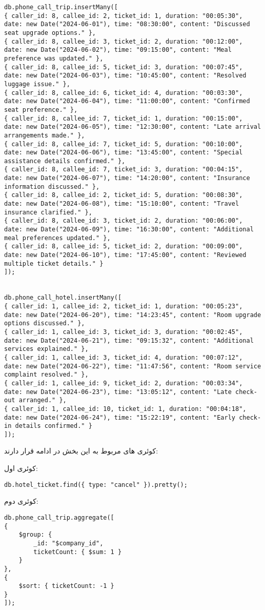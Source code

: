 \begin{lstlisting}
db.phone_call_trip.insertMany([
{ caller_id: 8, callee_id: 2, ticket_id: 1, duration: "00:05:30", date: new Date("2024-06-01"), time: "08:30:00", content: "Discussed seat upgrade options." },
{ caller_id: 8, callee_id: 3, ticket_id: 2, duration: "00:12:00", date: new Date("2024-06-02"), time: "09:15:00", content: "Meal preference was updated." },
{ caller_id: 8, callee_id: 5, ticket_id: 3, duration: "00:07:45", date: new Date("2024-06-03"), time: "10:45:00", content: "Resolved luggage issue." },
{ caller_id: 8, callee_id: 6, ticket_id: 4, duration: "00:03:30", date: new Date("2024-06-04"), time: "11:00:00", content: "Confirmed seat preference." },
{ caller_id: 8, callee_id: 7, ticket_id: 1, duration: "00:15:00", date: new Date("2024-06-05"), time: "12:30:00", content: "Late arrival arrangements made." },
{ caller_id: 8, callee_id: 7, ticket_id: 5, duration: "00:10:00", date: new Date("2024-06-06"), time: "13:45:00", content: "Special assistance details confirmed." },
{ caller_id: 8, callee_id: 7, ticket_id: 3, duration: "00:04:15", date: new Date("2024-06-07"), time: "14:20:00", content: "Insurance information discussed." },
{ caller_id: 8, callee_id: 2, ticket_id: 5, duration: "00:08:30", date: new Date("2024-06-08"), time: "15:10:00", content: "Travel insurance clarified." },
{ caller_id: 8, callee_id: 3, ticket_id: 2, duration: "00:06:00", date: new Date("2024-06-09"), time: "16:30:00", content: "Additional meal preferences updated." },
{ caller_id: 8, callee_id: 5, ticket_id: 2, duration: "00:09:00", date: new Date("2024-06-10"), time: "17:45:00", content: "Reviewed multiple ticket details." }
]);


db.phone_call_hotel.insertMany([
{ caller_id: 1, callee_id: 2, ticket_id: 1, duration: "00:05:23", date: new Date("2024-06-20"), time: "14:23:45", content: "Room upgrade options discussed." },
{ caller_id: 1, callee_id: 3, ticket_id: 3, duration: "00:02:45", date: new Date("2024-06-21"), time: "09:15:32", content: "Additional services explained." },
{ caller_id: 1, callee_id: 3, ticket_id: 4, duration: "00:07:12", date: new Date("2024-06-22"), time: "11:47:56", content: "Room service complaint resolved." },
{ caller_id: 1, callee_id: 9, ticket_id: 2, duration: "00:03:34", date: new Date("2024-06-23"), time: "13:05:12", content: "Late check-out arranged." },
{ caller_id: 1, callee_id: 10, ticket_id: 1, duration: "00:04:18", date: new Date("2024-06-24"), time: "15:22:19", content: "Early check-in details confirmed." }
]);
\end{lstlisting}
\setRTL

کوئری های مربوط به این بخش در ادامه قرار دارند:




کوئری اول:
\setLTR
\begin{lstlisting}
db.hotel_ticket.find({ type: "cancel" }).pretty();
\end{lstlisting}
\setRTL

کوئری دوم:
\setLTR
\begin{lstlisting}
db.phone_call_trip.aggregate([
{
	$group: {
		_id: "$company_id",
		ticketCount: { $sum: 1 }
	}
},
{
	$sort: { ticketCount: -1 }
}
]);
\end{lstlisting}
\setRTL